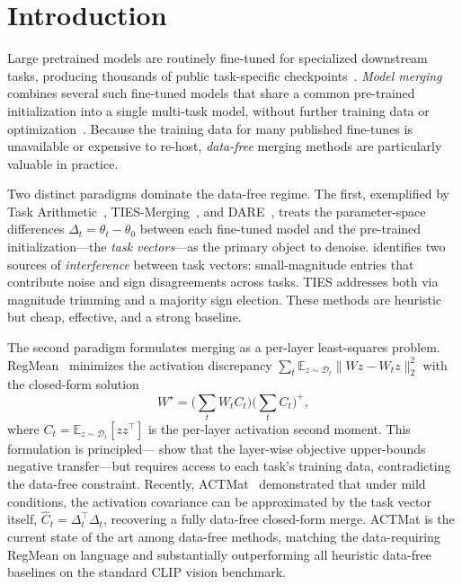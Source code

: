 \documentclass{article}
\theoremstyle{plain}
\theoremstyle{definition}
\theoremstyle{remark}
\begin{document}
\section{Introduction}
\label{sec:intro}

Large pretrained models are routinely fine-tuned for specialized downstream tasks, producing thousands of public task-specific checkpoints~\citep{wolf2020transformers}. \emph{Model merging} combines several such fine-tuned models that share a common pre-trained initialization into a single multi-task model, without further training data or optimization~\citep{wortsman2022model, matena2022merging, ilharco2023editing}. Because the training data for many published fine-tunes is unavailable or expensive to re-host, \emph{data-free} merging methods are particularly valuable in practice.

Two distinct paradigms dominate the data-free regime. The first, exemplified by Task Arithmetic~\citep{ilharco2023editing}, TIES-Merging~\citep{yadav2023ties}, and DARE~\citep{yu2024language}, treats the parameter-space differences $\Delta_t = \theta_t - \theta_0$ between each fine-tuned model and the pre-trained initialization---the \emph{task vectors}---as the primary object to denoise. \citet{yadav2023ties} identifies two sources of \emph{interference} between task vectors: small-magnitude entries that contribute noise and sign disagreements across tasks. TIES addresses both via magnitude trimming and a majority sign election. These methods are heuristic but cheap, effective, and a strong baseline.

The second paradigm formulates merging as a per-layer least-squares problem. RegMean~\citep{jin2023dataless} minimizes the activation discrepancy $\sum_t \mathbb{E}_{z\sim\mathcal{D}_t}\|Wz - W_t z\|_2^2$ with the closed-form solution
\begin{equation}
W^\star = \Big(\sum_t W_t C_t\Big)\Big(\sum_t C_t\Big)^{+},
\label{eq:regmean}
\end{equation}
where $C_t = \mathbb{E}_{z\sim\mathcal{D}_t}[z z^\top]$ is the per-layer activation second moment. This formulation is principled---\citet{sun2025lot} show that the layer-wise objective upper-bounds negative transfer---but requires access to each task's training data, contradicting the data-free constraint. Recently, ACTMat~\citep{hameed2026actmat} demonstrated that under mild conditions, the activation covariance can be approximated by the task vector itself, $\hat{C}_t = \Delta_t^\top \Delta_t$, recovering a fully data-free closed-form merge. ACTMat is the current state of the art among data-free methods, matching the data-requiring RegMean on language and substantially outperforming all heuristic data-free baselines on the standard CLIP vision benchmark.
\end{document}
